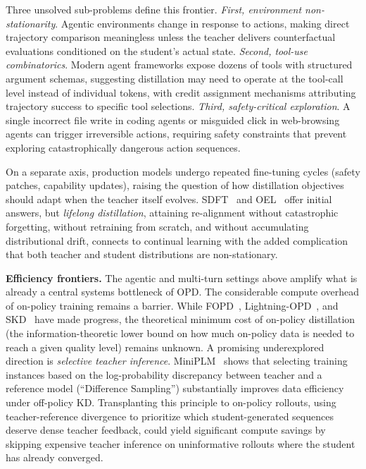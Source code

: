 \documentclass{article} %
\begin{document}
Three unsolved sub-problems define this frontier. \emph{First, environment non-stationarity}. Agentic environments change in response to actions, making direct trajectory comparison meaningless unless the teacher delivers counterfactual evaluations conditioned on the student's actual state. \emph{Second, tool-use combinatorics}. Modern agent frameworks expose dozens of tools with structured argument schemas, suggesting distillation may need to operate at the tool-call level instead of individual tokens, with credit assignment mechanisms attributing trajectory success to specific tool selections. \emph{Third, safety-critical exploration}. A single incorrect file write in coding agents or misguided click in web-browsing agents can trigger irreversible actions, requiring safety constraints that prevent exploring catastrophically dangerous action sequences.

On a separate axis, production models undergo repeated fine-tuning cycles (safety patches, capability updates), raising the question of how distillation objectives should adapt when the teacher itself evolves. SDFT~\citep{2601.19897} and OEL~\citep{2603.16856} offer initial answers, but \emph{lifelong distillation}, attaining re-alignment without catastrophic forgetting, without retraining from scratch, and without accumulating distributional drift, connects to continual learning with the added complication that both teacher and student distributions are non-stationary.

\textbf{Efficiency frontiers.} The agentic and multi-turn settings above amplify what is already a central systems bottleneck of OPD. The considerable compute overhead of on-policy training remains a barrier. While FOPD~\citep{2602.15260}, Lightning-OPD~\citep{wu2026lightning}, and SKD~\citep{2410.11325} have made progress, the theoretical minimum cost of on-policy distillation (the information-theoretic lower bound on how much on-policy data is needed to reach a given quality level) remains unknown. A promising underexplored direction is \emph{selective teacher inference}. MiniPLM~\citep{2410.17215} shows that selecting training instances based on the log-probability discrepancy between teacher and a reference model (``Difference Sampling'') substantially improves data efficiency under off-policy KD. Transplanting this principle to on-policy rollouts, using teacher-reference divergence to prioritize which student-generated sequences deserve dense teacher feedback, could yield significant compute savings by skipping expensive teacher inference on uninformative rollouts where the student has already converged.
\end{document}
